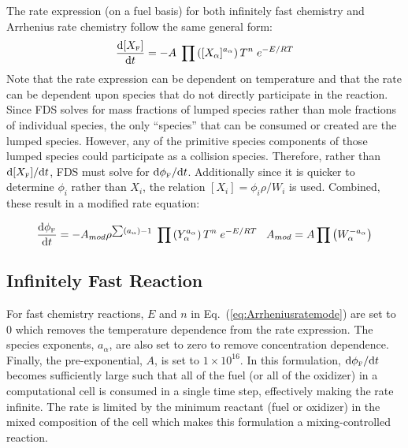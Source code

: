 The rate expression (on a fuel basis) for both infinitely fast chemistry and Arrhenius rate chemistry follow the same general form:
\begin{equation}\label{eq:Arrheniusrateeqn}
\frac{\mbox{d}[X_{\tiny \hbox{F}}]}{\mbox{d}t} = -A \; \prod \left([X_{\alpha}]^{a_{\alpha}} \right) T^n \; e^{-E/RT} 
\end{equation}
Note that the rate expression can be dependent on temperature and that the rate can be dependent upon species that do not directly participate in the reaction. Since FDS solves for mass fractions of lumped species rather than mole fractions of individual species, the only ``species'' that can be consumed or created are the lumped species.  However, any of the primitive species components of those lumped species could participate as a collision species.  Therefore, rather than $\mbox{d}[X_{\tiny \hbox{F}}]/\mbox{d}t$,  FDS must solve for $\mbox{d}\phi_{\tiny \hbox{F}}/\mbox{d}t$.  Additionally since it is quicker to determine $\phi_i$ rather than $X_i$, the relation $[X_i]=\phi_i \rho/W_i$ is used.  Combined, these result in a modified rate equation:

\begin{equation}\label{eq:Arrheniusratemode}
\frac{\mbox{d}\phi_{\tiny \hbox{F}}}{\mbox{d}t} = -A_{mod} \rho^{\sum (a_{\alpha}) -1} \; \prod \left(Y_{\alpha}^{a_{\alpha}} \right) T^n \; e^{-E/RT} \;\;\; A_{mod} = A \prod \left(W_{\alpha}^{-a_{\alpha}} \right)  
\end{equation}

\subsection{Infinitely Fast Reaction}
For fast chemistry reactions, $E$ and $n$ in Eq.~(\ref{eq:Arrheniusratemode}) are set to $0$ which removes the temperature dependence from the rate expression. The species exponents, $a_{\alpha}$, are also set to zero to remove concentration dependence. Finally, the pre-exponential, $A$, is set to $1 \times 10^{16}$. In this formulation, $\mbox{d}\phi_{\tiny \hbox{F}}/\mbox{d}t$ becomes sufficiently large such that all of the fuel (or all of the oxidizer) in a computational cell is consumed in a single time step, effectively making the rate infinite. The rate is limited by the minimum reactant (fuel or oxidizer) in the mixed composition of the cell which makes this formulation a mixing-controlled reaction.

